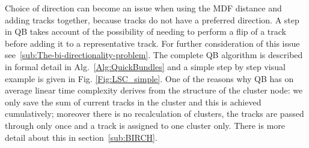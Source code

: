 \documentclass[preprint,authoryear,a4paper,10pt,onecolumn]{elsarticle}
\begin{document}
Choice of direction can become an issue when using the MDF distance and
adding tracks together, because tracks do not have a preferred
direction.  A step in QB takes account of the possibility of needing to
perform a flip of a track before adding it to a representative
track. For further consideration of this issue
see~\ref{sub:The-bi-directionality-problem}. The complete QB algorithm
is described in formal detail in Alg.~\ref{Alg:QuickBundles} and a
simple step by step visual example is given in
Fig. \ref{Fig:LSC_simple}.  One of the reasons why QB has on average
linear time complexity derives from the structure of the cluster node:
we only save the sum of current tracks in the cluster and this is
achieved cumulatively; moreover there is no recalculation of clusters,
the tracks are passed through only once and a track is assigned to one
cluster only. There is more detail about this in
section~\ref{sub:BIRCH}.
\end{document}
